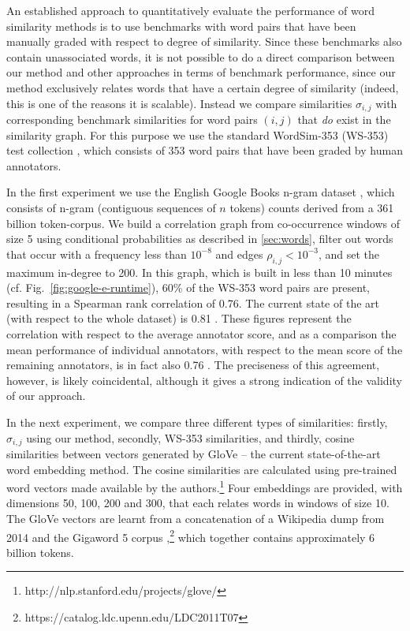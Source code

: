 \documentclass{kais}
\newcommand{\rn}[1]{\rho_{#1}}
\newcommand{\sy}[1]{\sigma_{#1}}
\begin{document}
An established approach to quantitatively evaluate the performance of word similarity methods is to use benchmarks
with word pairs that have been manually graded with respect to degree of similarity. Since these
benchmarks also contain unassociated words, it is not possible to do a direct comparison between our
method and other approaches in terms of benchmark performance, since our method exclusively relates words that 
have a certain degree of similarity (indeed, this is one of the reasons it is scalable). Instead we compare similarities 
$\sy{i,j}$ with corresponding benchmark similarities for word pairs $(i, j)$ that \emph{do} exist in the similarity graph.
For this purpose we use the standard WordSim-353 (WS-353) test collection \cite{Finkelstein01}, 
which consists of 353 word pairs that have been graded by human annotators. 

In the first experiment we use the English Google Books n-gram dataset \cite{Michel10,Lin12}, which consists of n-gram 
(contiguous sequences of $n$ tokens) counts derived from a 361 billion token-corpus.
We build a correlation graph from co-occurrence windows of size 5 using conditional probabilities as described in \ref{sec:words}, filter
out words that occur with a frequency less than $10^{-8}$ and edges $\rn{i,j} < 10^{-3}$, and
set the maximum in-degree to 200. In this graph, which is built in less than 10 minutes (cf. Fig.\ \ref{fig:google-e-runtime}),
60\% of the WS-353 word pairs are present, resulting in a Spearman rank correlation of 0.76. The current state of the
art (with respect to the whole dataset) is 0.81 \cite{Halawi12,Yih12}.
These figures represent the correlation with respect to the average annotator score, and as a comparison the mean performance
of individual annotators, with respect to the mean score of the remaining annotators, is in fact also 0.76 \cite{Hill14}.
The preciseness of this agreement, however, is likely coincidental, although it gives a strong indication of the 
validity of our approach.

In the next experiment, we compare three different types of similarities: firstly, $\sy{i, j}$ using our method, secondly, WS-353 similarities, and thirdly,
cosine similarities between vectors generated by GloVe \cite{Pennington2014} -- the current state-of-the-art word embedding method.
The cosine similarities are calculated using pre-trained word vectors made available by the authors.\footnote{http://nlp.stanford.edu/projects/glove/}
Four embeddings are provided, with dimensions 50, 100, 200 and 300, that each relates words in windows of size 10. 
The GloVe vectors are learnt from a concatenation of a Wikipedia dump from 2014 and the Gigaword 5 corpus 
\cite{Graff03},\footnote{https://catalog.ldc.upenn.edu/LDC2011T07} which together contains approximately 6 billion tokens.
\end{document}
